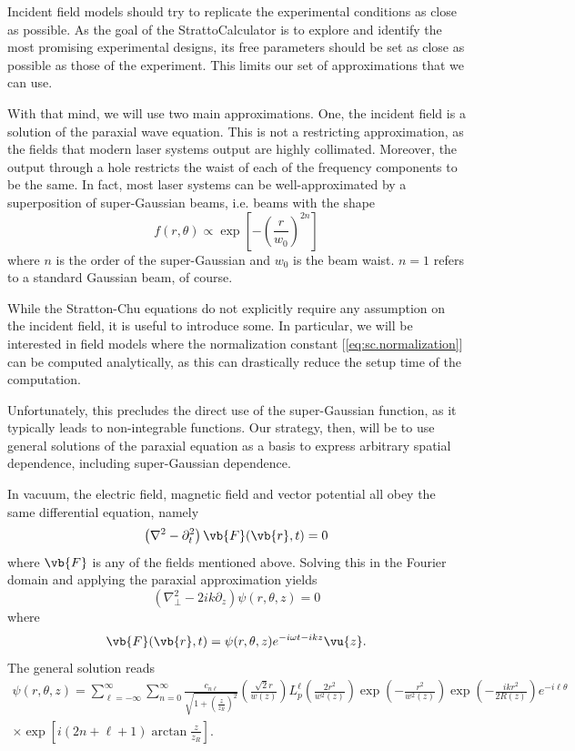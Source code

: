 \documentclass[11pt,SymmetricalJury]{inrsthesis/inrsthesis}
\begin{document}
Incident field models should try to replicate the experimental conditions
as close as possible. As the goal of the StrattoCalculator is to explore
and identify the most promising experimental designs, its free parameters
should be set as close as possible as those of the experiment. This limits
our set of approximations that we can use.

With that mind, we will use two main approximations. One, the incident field
is a solution of the paraxial wave equation. This is not a restricting approximation,
as the fields that modern laser systems output are highly collimated. Moreover,
the output through a hole restricts the waist of each of the frequency components
to be the same. In fact, most laser systems can be well-approximated by a
superposition of super-Gaussian beams, i.e. beams with the shape
  \begin{equation}
    f(r,\theta) \propto \exp\left[-\left(\frac{r}{w_0}\right)^{2n}\right]
  \end{equation}
where $n$ is the order of the super-Gaussian and $w_0$ is the beam waist.
$n=1$ refers to a standard Gaussian beam, of course.

While the Stratton-Chu equations do not explicitly require any assumption on
the incident field, it is useful to introduce some. In particular, we will be
interested in field models where the normalization constant [\eqref{eq:sc.normalization}]
can be computed analytically, as this can drastically reduce the setup time
of the computation. 

Unfortunately, this precludes the direct use of the super-Gaussian function,
as it typically leads to non-integrable functions. Our strategy, then, will
be to use general solutions of the paraxial equation as a basis to express
arbitrary spatial dependence, including super-Gaussian dependence.


In vacuum, the electric field, magnetic field and vector potential all obey
the same differential equation, namely
  \begin{equation}
    \left(\nabla^2-\partial_t^2\right)\vb{F}(\vb{r},t) = 0
  \end{equation}
where $\vb{F}$ is any of the fields mentioned above. Solving this
in the Fourier domain and applying the paraxial approximation
yields
  \begin{equation}
    \left(\nabla_\perp^2-2ik\partial_z\right)\psi(r,\theta,z) = 0
  \end{equation}
where
  \begin{equation}
    \vb{F}(\vb{r},t) = \psi(r,\theta,z)e^{-i\omega t - ikz} \vu{z}.
  \end{equation}
The general solution reads \cite{Allen1992}
  \begin{multline}
    \psi(r,\theta,z) = \sum_{\ell=-\infty}^\infty\sum_{n=0}^\infty
      \frac{c_{n\ell}}{\sqrt{1+\left(\frac{z}{z_R}\right)^2}}
      \left(\frac{\sqrt{2}r}{w(z)}\right)
      L_p^\ell\left(\frac{2r^2}{w^2(z)}\right)\exp\left(-\frac{r^2}{w^2(z)}\right)
      \exp\left(-\frac{ikr^2}{2R(z)}\right)e^{-i\ell\theta}\\
      \times\exp\left[i\left(2n+\ell+1\right)\arctan\frac{z}{z_R}\right].
  \end{multline}
\end{document}
